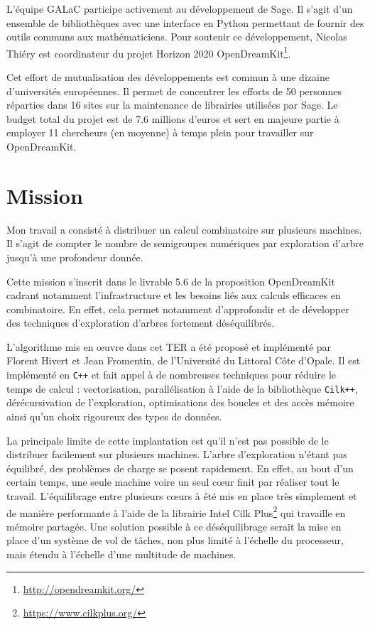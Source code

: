 \documentclass[12pt,a4paper]{report}
\begin{document}
L'équipe GALaC participe activement au développement de Sage. Il s'agit d'un ensemble de bibliothèques avec une interface en Python permettant de fournir des outils communs aux mathématiciens. Pour soutenir ce développement, Nicolas Thiéry est coordinateur du projet Horizon 2020 OpenDreamKit\footnote{\url{http://opendreamkit.org/}}.

Cet effort de mutualisation des développements est commun à une dizaine d'universités européennes. Il permet de concentrer les efforts de 50 personnes réparties dans 16 sites sur la maintenance de librairies utilisées par Sage. Le budget total du projet est de 7.6 millions d'euros et sert en majeure partie à employer 11 chercheurs (en moyenne) à temps plein pour travailler sur OpenDreamKit.

\section{Mission}
Mon travail a consisté à distribuer un calcul combinatoire sur plusieurs machines. Il s'agit de compter le nombre de semigroupes numériques par exploration d'arbre jusqu'à une profondeur donnée.

Cette mission s'inscrit dans le livrable 5.6 de la proposition OpenDreamKit cadrant notamment l'infrastructure et les besoins liés aux calculs efficaces en combinatoire. En effet, cela permet notamment d'approfondir et de développer des techniques d'exploration d'arbres fortement déséquilibrés.

L'algorithme mis en \oe{}uvre dans cet TER a été proposé et implémenté par Florent Hivert et Jean Fromentin, de l'Université du Littoral Côte d'Opale. Il est implémenté en \texttt{C++} et fait appel à de nombreuses techniques pour réduire le temps de calcul : vectorisation, parallélisation à l'aide de la bibliothèque \texttt{Cilk++}, dérécursivation de l'exploration, optimisations des boucles et des accès mémoire ainsi qu'un choix rigoureux des types de données.

La principale limite de cette implantation est qu'il n'est pas possible de le distribuer facilement sur plusieurs machines. L'arbre d'exploration n'étant pas équilibré, des problèmes de charge se posent rapidement. En effet, au bout d'un certain temps, une seule machine voire un seul c\oe{}ur finit par réaliser tout le travail. L'équilibrage entre plusieurs c\oe{}urs à été mis en place très simplement et de manière performante à l'aide de la librairie Intel Cilk Plus\footnote{\url{https://www.cilkplus.org/}} qui travaille en mémoire partagée. Une solution possible à ce déséquilibrage serait la mise en place d'un système de vol de tâches, non plus limité à l'échelle du processeur, mais étendu à l'échelle d'une multitude de machines.
\end{document}
